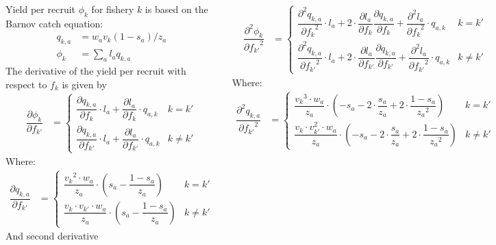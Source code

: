 \documentclass[17pt, a0paper, landscape,colspace=1cm]{tikzposter}
\newcommand{\dphip}  { \dfrac{{\partial \phi_{k}}}{{\partial f_{k'}}} }%
\newcommand{\dqak}   { \dfrac{{\partial q_{k,a}}}{{\partial f_k}} }
\newcommand{\dqakp}   { \dfrac{{\partial q_{k,a}}}{{\partial f_{k'}}} }
\newcommand{\dla}    { \dfrac{{\partial l_a}} {{\partial f_k}}}%
\newcommand{\dlap}    { \dfrac{{\partial l_a}} {{\partial f_{k'}}}}%
\newcommand{\ddla}   { \dfrac{{\partial^2 l_a}} {{\partial f_k}^2} }%
\newcommand{\ddlap}   { \dfrac{{\partial^2 l_a}} {{\partial f_{k'}}^2} }%
\newcommand{\ddphip}  { \dfrac{{\partial^2 \phi_k}}{{\partial f_{k'}}^2} }%
\newcommand{\ddqak}   { \dfrac{{\partial^2 q_{k,a}}}{{\partial f_k}^2} }
\newcommand{\ddqakp}   { \dfrac{{\partial^2 q_{k,a}}}{{\partial f_{k'}}^2} }
\begin{document}
\begin{columns}
{		Yield per recruit $\phi_k$ for fishery $k$ is based on the Barnov catch equation:
		\begin{align}
			q_{k,a} &= w_a v_k (1-s_a)/ z_a \nonumber \\
			\phi_k &= \sum_a l_a q_{k,a} \label{eq.15}
		\end{align}
		The derivative of the yield per recruit with respect to $f_k$ is given by
		\begin{align}
		\dphip &=
			\begin{cases}
				 \dqak \cdot l_a + \dla \cdot q_{a,k} & k = k'\\
				 \dqakp \cdot l_a + \dlap \cdot q_{a,k} & k \neq k'
			\end{cases}
		\end{align}
		Where:
		\begin{align}
		\dqakp &=
			\begin{cases}
				 \dfrac{{v_k}^{2} \cdot w_a}{z_a} \cdot \left( s_a- \dfrac{1-s_a}{z_a}\right) & k = k' \\
				\dfrac{{v_k}\cdot v_{k'} \cdot w_a}{z_a} \cdot \left( s_a- \dfrac{1-s_a}{z_a}\right) & k \neq k'
			\end{cases}
		\end{align}
		And second derivative

		\begin{align}
		\ddphip &=
			\begin{cases}
				 \ddqak \cdot l_a + 2 \cdot \dla \dqak + \ddla \cdot q_{a,k} & k = k'\\
				 \ddqakp \cdot l_a + 2 \cdot \dlap \dqakp + \ddlap \cdot q_{a,k} & k \neq k'
			\end{cases}
		\end{align}
		Where:
		\begin{align}
		\ddqakp &=
			\begin{cases}
				 \dfrac{{v_k}^{3} \cdot w_a}{z_a} \cdot \left( - s_a - 2 \cdot \dfrac{s_a}{z_a}+ 2 \cdot \dfrac{1-s_a}{{z_a}^2}\right) & k = k' \\
				\dfrac{{v_k}\cdot v_{k'}^2 \cdot w_a}{z_a} \cdot \left( - s_a - 2 \cdot \dfrac{s_a}{z_a}+ 2 \cdot \dfrac{1-s_a}{{z_a}^2}\right) &  k \neq k'
			\end{cases}
		\end{align}
		
	}
	
\end{columns}
\end{document}
